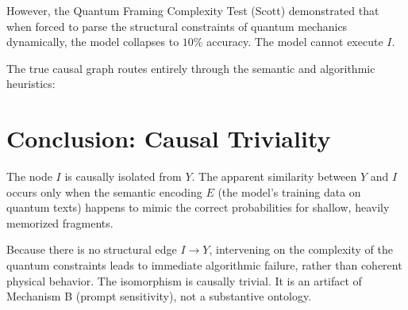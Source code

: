 \documentclass[12pt,a4paper]{article}
\begin{document}
\begin{center}
\end{center}

However, the Quantum Framing Complexity Test (Scott) demonstrated that when forced to parse the structural constraints of quantum mechanics dynamically, the model collapses to $10\%$ accuracy. The model cannot execute $I$.

The true causal graph routes entirely through the semantic and algorithmic heuristics:

\begin{center}
\end{center}

\section{Conclusion: Causal Triviality}

The node $I$ is causally isolated from $Y$. The apparent similarity between $Y$ and $I$ occurs only when the semantic encoding $E$ (the model's training data on quantum texts) happens to mimic the correct probabilities for shallow, heavily memorized fragments.

Because there is no structural edge $I \to Y$, intervening on the complexity of the quantum constraints leads to immediate algorithmic failure, rather than coherent physical behavior. The isomorphism is causally trivial. It is an artifact of Mechanism B (prompt sensitivity), not a substantive ontology.
\end{document}
